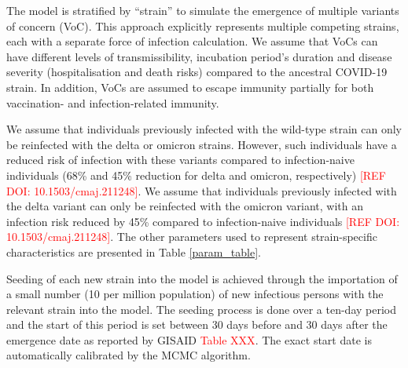 
The model is stratified by ``strain'' to simulate the emergence of multiple variants of concern (VoC).
This approach explicitly represents multiple competing strains, each with a separate force of infection calculation.
We assume that VoCs can have different levels of transmissibility, incubation period's duration and disease severity 
(hospitalisation and death risks) compared to the ancestral COVID-19 strain. In addition, VoCs are assumed to escape 
immunity partially for both vaccination- and infection-related immunity. 

We assume that individuals previously infected with the wild-type strain can only be reinfected with the delta or 
omicron strains. However, such individuals have a reduced risk of infection with these variants compared to 
infection-naive individuals (68\% and 45\% reduction for delta and omicron, respectively) \textcolor{red}{[REF DOI: 10.1503/cmaj.211248]}.
We assume that individuals previously infected with the delta variant can only be reinfected with the omicron variant, 
with an infection risk reduced by 45\% compared to infection-naive individuals \textcolor{red}{[REF DOI: 10.1503/cmaj.211248]}. 
The other parameters used to represent strain-specific characteristics are presented in Table \ref{param_table}.

Seeding of each new strain into the model is achieved through the importation of a small number (10 per million population) of new infectious persons with the relevant strain into the model.
The seeding process is done over a ten-day period and the start of this period is set between 30 days before and 30 days after the emergence date
as reported by GISAID \textcolor{red}{Table XXX}. The exact start date is automatically calibrated by the MCMC algorithm.
